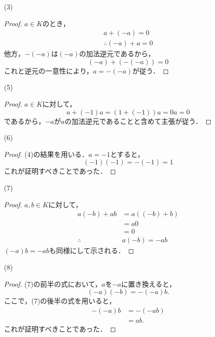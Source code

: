 \documentclass[a4paper,10pt,fleqn]{ltjsarticle}
\begin{document}
    \begin{itembox}[c]{(3)}
        \begin{proof}
$a \in K$のとき，
\begin{gather*}
    a+(-a)=0 \\
    \therefore (-a)+a =0
\end{gather*}
他方，$-(-a)$は$(-a)$の加法逆元であるから，
\[
    (-a)+(-(-a))=0
\]
これと逆元の一意性により，$a=-(-a)$が従う．
\end{proof}
\end{itembox}
\begin{itembox}[c]{(5)}
    \begin{proof}
    $a \in K$に対して，
    \[
        a+(-1)a=(1+(-1))a =0a =0
    \]
    であるから，$-a$が$a$の加法逆元であることと含めて主張が従う．
    \end{proof}
\end{itembox}
\newpage 
\begin{itembox}[c]{(6)}
    \begin{proof}
    (4)の結果を用いる．$a=-1$とすると，
    \[
        (-1)(-1)=-(-1)=1
    \]
    これが証明すべきことであった．
    \end{proof}
\end{itembox}
\begin{itembox}[c]{(7)}
    \begin{proof}
    $a,b \in K$に対して，
    \begin{align*}
     a(-b)+ab & = a((-b)+b) \\
     & = a0 \\
    & =0 \\
\therefore \quad & a(-b)=-ab 
    \end{align*}
$(-a)b = -ab$も同様にして示される．
\end{proof}
\end{itembox}
\begin{itembox}[c]{(8)}
    \begin{proof}
        (7)の前半の式において，$a$を$-a$に置き換えると，
        \[
            (-a)(-b) = -(-a)b.
        \]
        ここで，(7)の後半の式を用いると，
        \begin{align*} 
            -(-a)b & = -(-ab) \\
            & = ab.
        \end{align*}
        これが証明すべきことであった．
        \end{proof}
\end{itembox}
\end{document}
